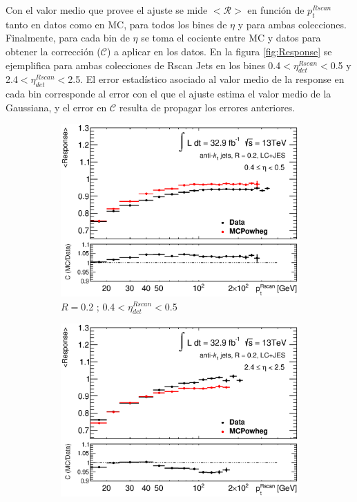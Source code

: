 Con el valor medio que provee el ajuste se mide $<\mathcal{R}>$ en función de $p_t^{Rscan}$ tanto en datos como en MC, para todos los bines de $\eta$ y para ambas colecciones. Finalmente, para cada bin de $\eta$ se toma el cociente entre MC y datos para obtener la corrección ($\mathcal{C}$) a aplicar en los datos. En la figura \ref{fig:Response} se ejemplifica para ambas colecciones de Rscan Jets en los bines 0.4$<\eta^{Rscan}_{det}<$0.5 y 2.4$<\eta^{Rscan}_{det}<$2.5. El error estadístico asociado al valor medio de la response en cada bin corresponde al error con el que el ajuste estima el valor medio de la Gaussiana, y el error en $\mathcal{C}$ resulta de propagar los errores anteriores. 
\begin{figure}[ht]
    \centering
    \begin{subfigure}[b]{0.495\textwidth}
        \centering
        \includegraphics[width=\textwidth]{images/ResponseRatio2LC_49}
        \caption{$R=$0.2 ; 0.4$<\eta^{Rscan}_{det}<$0.5}
    \end{subfigure}
    \hfill
    \begin{subfigure}[b]{0.495\textwidth}
        \centering
        \includegraphics[width=\textwidth]{images/ResponseRatio2LC_69}

\end{subfigure}
\end{figure}
